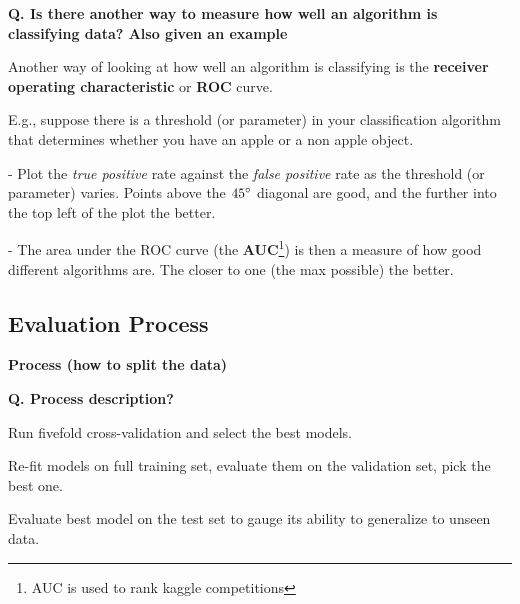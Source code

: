\begin{frame}[fragile]{\textbf{Q. Is there another way to measure how well an
      algorithm is classifying data? Also given an example}}
  \begin{wideitemize}
  \item Another way of looking at how well an algorithm is classifying is the
    \textbf{receiver operating characteristic} or \textbf{ROC} curve.
    \item E.g., suppose there is a threshold (or parameter) in your
      classification algorithm that determines whether you have an apple or a
      non apple object.
      \begin{wideitemize}
      \item[-] Plot the \textit{true positive} rate against the
        \textit{false positive} rate as the threshold (or parameter) varies.
        Points above the $45\degree$ diagonal are good, and the further
        into the top left of the plot the better.
      \item[-] The area under the ROC curve (the \textbf{AUC}\footnote{AUC is
          used to rank kaggle competitions}) is then a measure of how
        good different algorithms are. The closer to one (the max possible) the better.
      \end{wideitemize}
  \end{wideitemize}
\end{frame}


\subsection{Evaluation Process}
\begin{transitionsubframe}
  \begin{center}
    \Huge \textbf{Process (how to split the data)}
  \end{center}
\end{transitionsubframe}

\begin{frame}[fragile]{\textbf{Q. Process description?}}
  \begin{wideitemize}
  \item Run fivefold cross-validation and select the best models.
  \item Re-fit models on full training set, evaluate them on the validation set, pick the best one.
  \item Evaluate best model on the test set to gauge its ability
  to generalize to unseen data.
  \end{wideitemize}
\end{frame}

